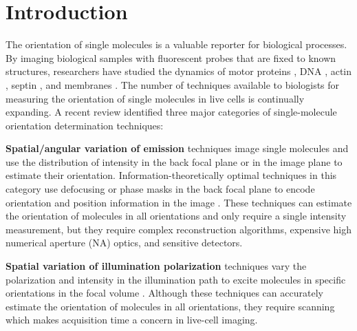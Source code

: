\documentclass[10pt]{article}
\begin{document}




\section{Introduction}
The orientation of single molecules is a valuable reporter for
biological processes. By imaging biological samples with fluorescent probes that
are fixed to known structures, researchers have studied the dynamics of motor
proteins \cite{peterman2001, forkey2003}, DNA \cite{backer2016}, actin
\cite{mehta2016}, septin \cite{demay2011, mcquilken2017}, and membranes
\cite{anantharam2010}. The number of techniques available to biologists for
measuring the orientation of single molecules in live cells is continually
expanding. A recent review \cite{backlund2014} identified three major categories
of single-molecule orientation determination techniques:

\textbf{Spatial/angular variation of emission} techniques image single molecules
and use the distribution of intensity in the back focal plane \cite{lieb2004} or
in the image plane \cite{backer2014} to estimate their
orientation. Information-theoretically optimal techniques in this category use
defocusing or phase masks in the back focal plane to encode orientation and
position information in the image \cite{agrawal2012}. These techniques can
estimate the orientation of molecules in all orientations and only require a
single intensity measurement, but they require complex reconstruction
algorithms, expensive high numerical aperture (NA) optics, and sensitive
detectors.

\textbf{Spatial variation of illumination polarization} techniques vary the
polarization and intensity in the illumination path to excite molecules in
specific orientations in the focal volume \cite{debarre2004}. Although these
techniques can accurately estimate the orientation of molecules in all
orientations, they require scanning which makes acquisition time a concern in
live-cell imaging.
\end{document}
